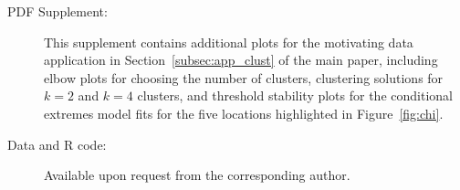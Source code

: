 \documentclass[12pt,compact]{article}
\newcommand{\JSGa}{\mathop{\mathrm{JS}^{\mathrm{G}_{\lambda}}}\nolimits}
\begin{document}
\begin{description}

  \item[PDF Supplement:] This supplement contains additional plots for the motivating data application in Section~\ref{subsec:app_clust} of the main paper, including elbow plots for choosing the number of clusters, clustering solutions for $k=2$ and $k=4$ clusters, and threshold stability plots for the conditional extremes model fits for the five locations highlighted in Figure~\ref{fig:chi}.

\item[Data and R code:] Available upon request from the corresponding author.

\end{description}


% 
{\small


}


% 
\clearpage
% 
%
\end{document}
